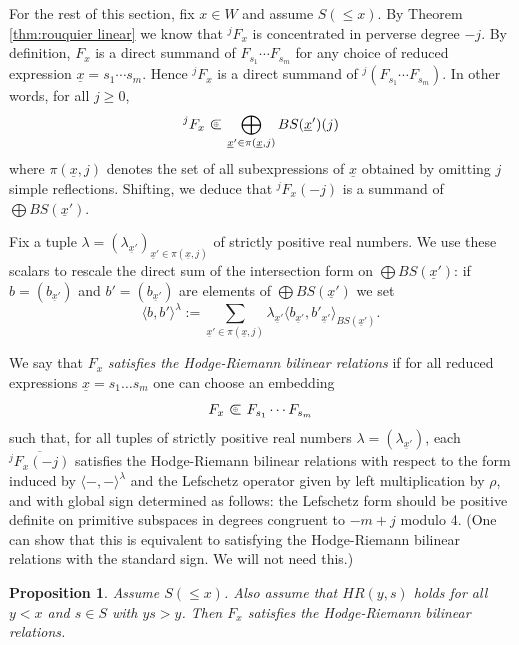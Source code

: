 \documentclass[11pt]{amsart}
\numberwithin{equation}{section}
\def\l{\lambda}
\def\un{\underline}
\def\summand{
\mathbin{\tikz [baseline=-3pt]
{
\clip (-0.2,-0.15) rectangle (0.2,0.15);
\node[scale=1.2] at (0,0) {$\subset$}; \node[scale=0.5] at
  (0,0) {$\oplus$}; }}
}
\newtheorem{prop}[thm]{Proposition}
\theoremstyle{definition}
\theoremstyle{remark}
\begin{document}
{For the rest of this section, fix $x \in W$ and assume $S(\le\!x)$. By Theorem \ref{thm:rouquier linear}
we know that ${}^jF_x$ is concentrated in perverse degree $-j$. 
By definition, $F_x$ is a direct summand of $F_{s_1} \cdots
F_{s_m}$ for any choice of reduced expression $\un{x} = s_1 \cdots
s_m$. Hence ${}^jF_x$ is a direct summand of ${}^j(F_{s_1} \cdots
F_{s_m})$. In other words, for all $j \ge 0$, 
\begin{equation} \label{eq:BSembedding}
 {}^jF_x \summand \bigoplus_{\un{x}' \in \pi(\un{x}, j)}
BS(\un{x}')(j)
\end{equation} where $\pi(\un{x}, j)$ denotes the set
of all subexpressions of $\un{x}$ obtained by 
omitting $j$ simple reflections. Shifting, we deduce that $
{}^jF_x(-j)$ is a summand of $\bigoplus BS(\un{x}')$.

Fix a tuple $\l = (\l_{\un{x}'})_{\un{x}' \in \pi(\un{x}, j)}$ of strictly
positive real numbers. We use these scalars to rescale the direct sum
of the intersection form on $\bigoplus BS(\un{x}')$: if $b =
(b_{\un{x}'})$ and $b' = (b_{\un{x}'})$ are elements of $\bigoplus
    BS(\un{x}')$ we set
\[
\langle b, b' \rangle^{\l} := \sum_{\un{x}' \in \pi(\un{x}, j)} \lambda_{\un{x}'} \langle b_{\un{x}'},
b'_{\un{x}'} \rangle_{BS(\un{x}')}.
\]


We say that $F_x$ \emph{satisfies the Hodge-Riemann bilinear
  relations} if for all reduced expressions $\un{x} = s_1 \dots s_m$
one can choose an embedding \[F_x \summand F_{s_1} \cdots
F_{s_m}\]such that, for all tuples of strictly positive real numbers $\l =
(\l_{\un{x}'})$, each $\overline{{}^jF_x(-j)}$ satisfies the
Hodge-Riemann bilinear 
relations with respect to the form induced by $\langle - , -
\rangle^\l$ and the Lefschetz operator given by left multiplication by
$\rho$, and with global sign determined as follows: the 
Lefschetz form should be positive definite on primitive subspaces in
degrees congruent to $-m + j$ modulo 4. (One can show that
this is equivalent to satisfying the Hodge-Riemann bilinear relations
with the standard sign. We will not need this.)

\begin{prop} \label{prop:signs} Assume $S(\le\!x)$. Also assume that $HR(y,s)$ holds for all $y
  < x$ and $s \in S$ with $ys > y$. Then $F_x$ satisfies the
  Hodge-Riemann bilinear relations.\end{prop}

}
\end{document}
